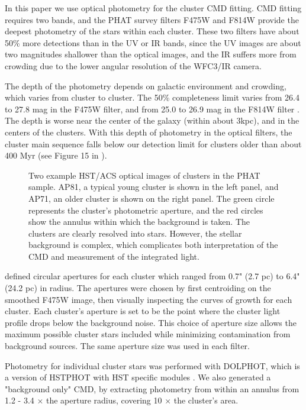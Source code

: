 \documentclass{emulateapj}
\begin{document}
In this paper we use optical photometry for the cluster CMD fitting.  CMD fitting requires two bands, and the PHAT survey filters F475W and F814W provide the deepest photometry of the stars within each cluster.  These two filters have about 50\% more detections than in the UV or IR bands, since the UV images are about two magnitudes shallower than the optical images, and the IR suffers more from crowding due to the lower angular resolution of the WFC3/IR camera.  

The depth of the photometry depends on galactic environment and crowding, which varies from cluster to cluster.  The 50\% completeness limit varies from 26.4 to 27.8 mag in the F475W filter, and from 25.0 to 26.9 mag in the F814W filter \citep{Lewis15}.  The depth is worse near the center of the galaxy (within about 3kpc), and in the centers of the clusters.  With this depth of photometry in the optical filters, the cluster main sequence falls below our detection limit for clusters older than about 400 Myr (see Figure 15 in \cite{Lewis15}).

\begin{figure*}[!htbp]
\centering
\mbox{}
\caption{Two example HST/ACS optical images of clusters in the PHAT sample.  AP81, a typical young cluster is shown in the left panel, and AP71, an older cluster is shown on the right panel.  The green circle represents the cluster's photometric aperture, and the red circles show the annulus within which the background is taken.  The clusters are clearly resolved into stars.  However, the stellar background is complex, which complicates both interpretation of the CMD and measurement of the integrated light.}
\label{fig:images}
\end{figure*}

\cite{Johnson15} defined circular apertures for each cluster which ranged from 0.7" (2.7 pc) to 6.4" (24.2 pc) in radius.  The apertures were chosen by first centroiding on the smoothed F475W image, then visually inspecting the curves of growth for each cluster.  Each cluster's aperture is set to be the point where the cluster light profile drops below the background noise.  This choice of aperture size allows the maximum possible cluster stars included while minimizing contamination from background sources.  The same aperture size was used in each filter.

Photometry for individual cluster stars was performed with DOLPHOT, which is a version of HSTPHOT with HST specific modules \citep{Dolphin00}.  We also generated a "background only" CMD, by extracting photometry from within an annulus from 1.2 - 3.4 $\times$ the aperture radius, covering 10 $\times$ the cluster's area.
\end{document}
